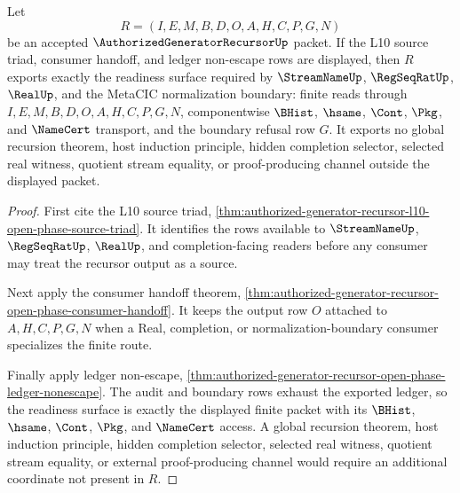 \begin{theorem}
\label{thm:authorized-generator-recursor-l10-readiness-closure}
Let
$$
R=(I,E,M,B,D,O,A,H,C,P,G,N)
$$
be an accepted $\AuthorizedGeneratorRecursorUp$ packet. If the L10 source triad, consumer handoff, and ledger non-escape rows are displayed, then $R$ exports exactly the readiness surface required by $\StreamNameUp$, $\RegSeqRatUp$, $\RealUp$, and the MetaCIC normalization boundary: finite reads through $I,E,M,B,D,O,A,H,C,P,G,N$, componentwise $\BHist$, $\hsame$, $\Cont$, $\Pkg$, and $\NameCert$ transport, and the boundary refusal row $G$. It exports no global recursion theorem, host induction principle, hidden completion selector, selected real witness, quotient stream equality, or proof-producing channel outside the displayed packet.
\end{theorem}
\begin{proof}
First cite the L10 source triad, \autoref{thm:authorized-generator-recursor-l10-open-phase-source-triad}. It identifies the rows available to $\StreamNameUp$, $\RegSeqRatUp$, $\RealUp$, and completion-facing readers before any consumer may treat the recursor output as a source.

Next apply the consumer handoff theorem, \autoref{thm:authorized-generator-recursor-open-phase-consumer-handoff}. It keeps the output row $O$ attached to $A,H,C,P,G,N$ when a Real, completion, or normalization-boundary consumer specializes the finite route.

Finally apply ledger non-escape, \autoref{thm:authorized-generator-recursor-open-phase-ledger-nonescape}. The audit and boundary rows exhaust the exported ledger, so the readiness surface is exactly the displayed finite packet with its $\BHist$, $\hsame$, $\Cont$, $\Pkg$, and $\NameCert$ access. A global recursion theorem, host induction principle, hidden completion selector, selected real witness, quotient stream equality, or external proof-producing channel would require an additional coordinate not present in $R$.
\end{proof}

